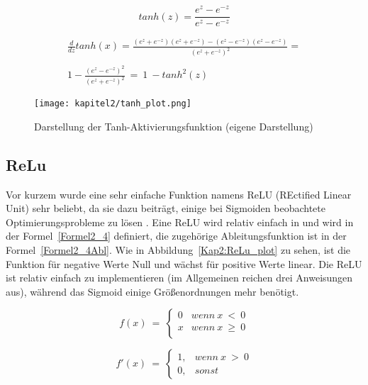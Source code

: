 \begin{equation} \label{Formel2_3}
  tanh(z) = \frac{e^{z}-e^{-z}}{e^{z}-e^{-z}}
\end{equation}

\begin{equation} \label{Formel2_3Abl}
  \begin{array}{ c }
    \frac{d}{dz} tanh( x) =\frac{\left( e^{z} +e^{-z}\right)\left( e^{z} +e^{-z}\right) -\left( e^{z} -e^{-z}\right)\left( e^{z} -e^{-z}\right)}{\left( e^{z} +e^{-z}\right)^{2}} = \\
    \\
    1-\frac{\left( e^{z} -e^{-z}\right)^{2}}{\left( e^{z} +e^{-z}\right)^{2}} \ =\ 1\ -tanh^{2}( z)
  \end{array}
\end{equation}

\begin{figure}[H]
  \centering
  \texttt{[image: kapitel2/tanh\_plot.png]}
  \caption[Darstellung der Tanh-Aktivierungsfunktion]{Darstellung der Tanh-Aktivierungsfunktion (eigene Darstellung)}
  \label{Kap2:Tanh_plot}
\end{figure}

\subsection{ReLu}
Vor kurzem wurde eine sehr einfache Funktion namens ReLU (REctified Linear Unit) sehr beliebt, da sie dazu beiträgt, einige bei Sigmoiden beobachtete Optimierungsprobleme zu lösen \cite*[11]{AntonioGuili;AmitaKapoor;SujitPal2019}. Eine ReLU wird relativ einfach in und wird in der Formel~\ref{Formel2_4} definiert, die zugehörige Ableitungsfunktion ist in der Formel~\ref{Formel2_4Abl}. Wie in Abbildung~\ref{Kap2:ReLu_plot} zu sehen, ist die Funktion für negative Werte Null und wächst für positive Werte linear. Die ReLU ist relativ einfach zu implementieren (im Allgemeinen reichen drei Anweisungen aus), während das Sigmoid einige Größenordnungen mehr benötigt.

\begin{equation} \label{Formel2_4}
  f( x) \ =\ \begin{cases}
    0 & wenn\ x\  <\ 0    \\
    x & wenn\ x\  \geq\ 0 \\
  \end{cases}
\end{equation}

\begin{equation} \label{Formel2_4Abl}
  f'( x) \ =\ \begin{cases}
    1, & wenn\ x\  >\ 0 \\
    0, & sonst
  \end{cases}
\end{equation}

